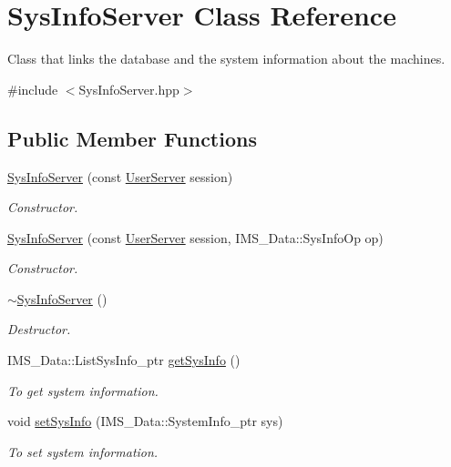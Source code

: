 \hypertarget{classSysInfoServer}{
\section{SysInfoServer Class Reference}
\label{classSysInfoServer}
}


Class that links the database and the system information about the machines.  




{\ttfamily \#include $<$SysInfoServer.hpp$>$}

\subsection*{Public Member Functions}
\begin{DoxyCompactItemize}
\item 
\hyperlink{classSysInfoServer_a8b5effe893f2e69171eca72229687e28}{SysInfoServer} (const \hyperlink{classUserServer}{UserServer} session)
\begin{DoxyCompactList}\small\item\em Constructor. \item\end{DoxyCompactList}\item 
\hyperlink{classSysInfoServer_a5e516501b5ff7d9ed7f3229ba8d8f081}{SysInfoServer} (const \hyperlink{classUserServer}{UserServer} session, IMS\_\-Data::SysInfoOp op)
\begin{DoxyCompactList}\small\item\em Constructor. \item\end{DoxyCompactList}\item 
\hypertarget{classSysInfoServer_a8e159903608bb5611d7ecec3006f4ec0}{
\hyperlink{classSysInfoServer_a8e159903608bb5611d7ecec3006f4ec0}{$\sim$SysInfoServer} ()}
\label{classSysInfoServer_a8e159903608bb5611d7ecec3006f4ec0}

\begin{DoxyCompactList}\small\item\em Destructor. \item\end{DoxyCompactList}\item 
IMS\_\-Data::ListSysInfo\_\-ptr \hyperlink{classSysInfoServer_a9ee54512a444a1ff5a044a8e31cc4e4a}{getSysInfo} ()
\begin{DoxyCompactList}\small\item\em To get system information. \item\end{DoxyCompactList}\item 
\hypertarget{classSysInfoServer_a58a2670d6fcd25523eac617ba3c1973c}{
void \hyperlink{classSysInfoServer_a58a2670d6fcd25523eac617ba3c1973c}{setSysInfo} (IMS\_\-Data::SystemInfo\_\-ptr sys)}
\label{classSysInfoServer_a58a2670d6fcd25523eac617ba3c1973c}

\begin{DoxyCompactList}\small\item\em To set system information. \item\end{DoxyCompactList}\end{DoxyCompactItemize}
